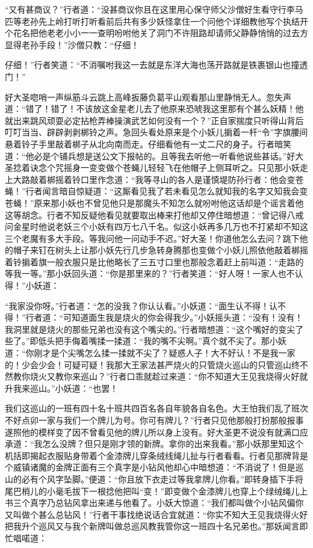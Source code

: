 \documentclass[12pt,UTF8]{ctexbook}
\begin{document}
“又有甚商议？”行者道：“没甚商议你且在这里用心保守师父沙僧好生看守行李马匹等老孙先上岭打听打听看前后共有多少妖怪拿住一个问他个详细教他写个执结开个花名把他老老小小一一查明吩咐他关了洞门不许阻路却请师父静静悄悄的过去方显得老孙手段！”沙僧只教：“仔细！

仔细！”行者笑道：“不消嘱咐我这一去就是东洋大海也荡开路就是铁裹银山也撞透门！”

好大圣唿哨一声纵筋斗云跳上高峰扳藤负葛平山观看那山里静悄无人。忽失声道：“错了！错了！不该放这金星老儿去了他原来恐唬我这里那有个甚么妖精！他就出来跳风顽耍必定拈枪弄棒操演武艺如何没有一个？”正自家揣度只听得山背后叮叮当当、辟辟剥剥梆铃之声。急回头看处原来是个小妖儿掮着一杆“令”字旗腰间悬着铃子手里敲着梆子从北向南而走。仔细看他有一丈二尺的身子。行者暗笑道：“他必是个铺兵想是送公文下报帖的。且等我去听他一听看他说些甚话。”好大圣捻着诀念个咒摇身一变变做个苍蝇儿轻轻飞在他帽子上侧耳听之。只见那小妖走上大路敲着梆摇着铃口里作念道：“我等寻山的各人是谨慎堤防孙行者：他会变苍蝇！”行者闻言暗自惊疑道：“这厮看见我了若未看见怎么就知我的名字又知我会变苍蝇！”原来那小妖也不曾见他只是那魔头不知怎么就吩咐他这话却是个谣言着他这等胡念。行者不知反疑他看见就要取出棒来打他却又停住暗想道：“曾记得八戒问金星时他说老妖三个小妖有四万七八千名。似这小妖再多几万也不打紧却不知这三个老魔有多大手段。等我问他一问动手不迟。”好大圣！你道他怎么去问？跳下他的帽子来钉在树头上让那小妖先行几步急转身腾那也变做个小妖儿照依他敲着梆摇着铃掮着旗一般衣服只是比他略长了三五寸口里也那般念着赶上前叫道：“走路的等我一等。”那小妖回头道：“你是那里来的？”行者笑道：“好人呀！一家人也不认得！”小妖道：

“我家没你呀。”行者道：“怎的没我？你认认看。”小妖道：“面生认不得！认不得！”行者道：“可知道面生我是烧火的你会得我少。”小妖摇头道：“没有！没有！我洞里就是烧火的那些兄弟也没有这个嘴尖的。”行者暗想道：“这个嘴好的变尖了些了。”即低头把手侮着嘴揉一揉道：“我的嘴不尖啊。”真个就不尖了。那小妖道：“你刚才是个尖嘴怎么揉一揉就不尖了？疑惑人子！大不好认！不是我一家的！少会少会！可疑可疑！我那大王家法甚严烧火的只管烧火巡山的只管巡山终不然教你烧火又教你来巡山？”行者口乖就趁过来道：“你不知道大王见我烧得火好就升我来巡山。”小妖道：“也罢！

我们这巡山的一班有四十名十班共四百名各自年貌各自名色。大王怕我们乱了班次不好点卯一家与我们一个牌儿为号。你可有牌儿？”行者只见他那般打扮那般报事遂照他的模样变了因不曾看见他的牌儿所以身上没有。好大圣更不说没有就满口应承道：“我怎么没牌？但只是刚才领的新牌。拿你的出来我看。”那小妖那里知这个机括即揭起衣服贴身带着个金漆牌儿穿条绒线绳儿扯与行者看看。行者见那牌背是个威镇诸魔的金牌正面有三个真字是小钻风他却心中暗想道：“不消说了！但是巡山的必有个风字坠脚。”便道：“你且放下衣走过等我拿牌儿你看。”即转身插下手将尾巴梢儿的小毫毛拔下一根捻他把叫“变！”即变做个金漆牌儿也穿上个绿绒绳儿上书三个真字乃总钻风拿出来递与他看了。小妖大惊道：“我们都叫做个小钻风偏你又叫做个甚么总钻风！”行者干事找绝说话合宜就道：“你实不知大王见我烧得火好把我升个巡风又与我个新牌叫做总巡风教我管你这一班四十名兄弟也。”那妖闻言即忙唱喏道：
\end{document}
